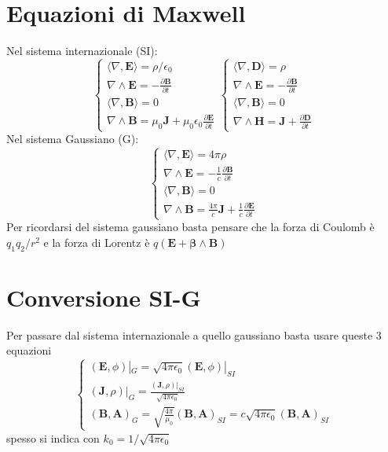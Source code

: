 \documentclass[11pt,a4paper]{report}
\newcommand{\vettore}[1]{\mathbf{#1}}
\newcommand{\pscal}[2]{\langle #1,#2\rangle}
\newcommand{\pvet}[2]{#1\wedge #2}
\begin{document}
	\section{Equazioni di Maxwell}
		Nel sistema internazionale (SI):
		\begin{equation}
			\begin{cases}
				\pscal \nabla{\vettore E}=\rho/\epsilon_0\\
				\pvet \nabla {\vettore E}=-\frac{\partial \vettore B}{\partial t}\\
				\pscal \nabla{\vettore B}=0\\
				\pvet \nabla {\vettore B}=\mu_0\vettore J+\mu_0\epsilon_0\frac{\partial \vettore E}{\partial t}
			\end{cases}
			\begin{cases}
				\pscal \nabla{\vettore D}=\rho\\
				\pvet \nabla {\vettore E}=-\frac{\partial \vettore B}{\partial t}\\
				\pscal \nabla{\vettore B}=0\\
				\pvet \nabla {\vettore H}=\vettore J+\frac{\partial \vettore D}{\partial t}
			\end{cases}
		\end{equation}
		Nel sistema Gaussiano (G):
		\begin{equation}
			\begin{cases}
				\pscal \nabla{\vettore E}=4\pi\rho\\
				\pvet \nabla {\vettore E}=-\frac 1 c \frac{\partial \vettore B}{\partial t}\\
				\pscal \nabla{\vettore B}=0\\
				\pvet \nabla {\vettore B}=\frac{4\pi}c \vettore J+\frac 1 c \frac{\partial \vettore E}{\partial t}
			\end{cases}
		\end{equation}
		Per ricordarsi del sistema gaussiano basta pensare che la forza di Coulomb è $q_1q_2/r^2$ e la forza di Lorentz è $q(\vettore E+\pvet{\vettore \beta}{\vettore B})$
	\section{Conversione SI-G}
		Per passare dal sistema internazionale a quello gaussiano basta usare queste 3 equazioni
		\begin{equation}
			\begin{cases}
				(\vettore E,\phi)|_G=\sqrt{4\pi\epsilon_0}(\vettore E,\phi)|_{SI}\\
				(\vettore J, \rho)|_G=\frac{(\vettore J, \rho)|_{SI}}{\sqrt{4\pi\epsilon_0}}\\
				(\vettore B,\vettore A)_G=
				\sqrt{\frac{4\pi}{\mu_0}}(\vettore B,\vettore A)_{SI}=
				c\sqrt{4\pi\epsilon_0}(\vettore B,\vettore A)_{SI}
			\end{cases}
		\end{equation}
		spesso si indica con $k_0=1/\sqrt{4\pi\epsilon_0}$
\end{document}
